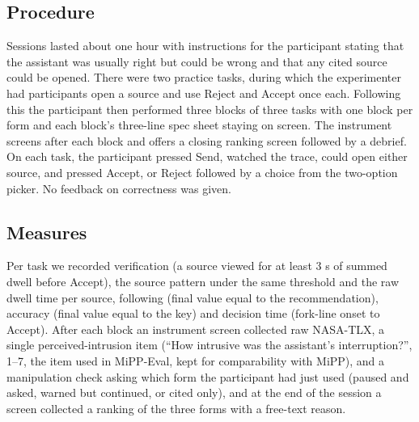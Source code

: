 \documentclass[manuscript,review]{acmart}
\begin{document}
\subsection{Procedure}
\label{sec:procedure}
Sessions lasted about one hour with instructions for the participant stating that the
assistant was usually right but could be wrong and that any cited source
could be opened. There were two practice tasks, during which the experimenter had
participants open a source and use Reject and Accept once each. Following this the participant then performed three
blocks of three tasks with one block per form and each block's three-line spec
sheet staying on screen. The instrument screens after each block and offers a
closing ranking screen followed by a debrief. On each task, the participant pressed Send, watched the trace, could open either source, and pressed Accept, or Reject followed by a choice from the two-option picker. No feedback on correctness was given.

\subsection{Measures}
\label{sec:measures}
Per task we recorded verification (a source viewed for at least 3 s of
summed dwell before Accept), the source pattern under the same threshold
and the raw dwell time per source, following (final value equal to
the recommendation), accuracy (final value equal to the key) and decision
time (fork-line onset to Accept). After each block an instrument screen
collected raw NASA-TLX, a single perceived-intrusion item (``How
intrusive was the assistant's interruption?'', 1--7, the item used in
MiPP-Eval, kept for comparability with MiPP), and a manipulation check
asking which form the participant had just used (paused and asked, warned
but continued, or cited only), and at the end of the
session a screen collected a ranking of the three forms with a free-text
reason.
\end{document}
